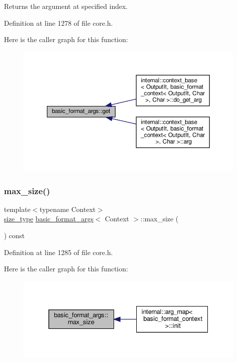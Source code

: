 Returns the argument at specified index. 

Definition at line 1278 of file core.\+h.

Here is the caller graph for this function\+:
\nopagebreak
\begin{figure}[H]
\begin{center}
\leavevmode
\includegraphics[width=350pt]{classbasic__format__args_ad381a683779a65c09c258faa2a0dbbea_icgraph}
\end{center}
\end{figure}
\mbox{\label{classbasic__format__args_a6deab6159b5377124f3a9d6ad5b0bfa2}} 
\subsubsection{\texorpdfstring{max\+\_\+size()}{max\_size()}}
{\footnotesize\ttfamily template$<$typename Context$>$ \\
\hyperlink{classbasic__format__args_abced2890cde3213027d493494d89c611}{size\+\_\+type} \hyperlink{classbasic__format__args}{basic\+\_\+format\+\_\+args}$<$ Context $>$\+::max\+\_\+size (\begin{DoxyParamCaption}{ }\end{DoxyParamCaption}) const\hspace{0.3cm}{\ttfamily [inline]}}



Definition at line 1285 of file core.\+h.

Here is the caller graph for this function\+:
\nopagebreak
\begin{figure}[H]
\begin{center}
\leavevmode
\includegraphics[width=332pt]{classbasic__format__args_a6deab6159b5377124f3a9d6ad5b0bfa2_icgraph}
\end{center}
\end{figure}


